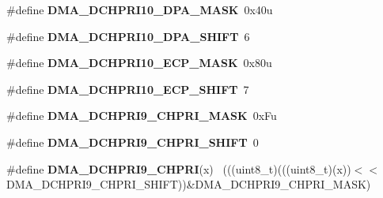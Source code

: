 \begin{DoxyCompactItemize}
\item 
\hypertarget{group___d_m_a___register___masks_gaf20edd13f4d37134819d152681b34b4e}{}\#define {\bfseries D\+M\+A\+\_\+\+D\+C\+H\+P\+R\+I10\+\_\+\+D\+P\+A\+\_\+\+M\+A\+S\+K}~0x40u\label{group___d_m_a___register___masks_gaf20edd13f4d37134819d152681b34b4e}

\item 
\hypertarget{group___d_m_a___register___masks_ga81809b2ae57f16cec20cb50f1a4a8b1e}{}\#define {\bfseries D\+M\+A\+\_\+\+D\+C\+H\+P\+R\+I10\+\_\+\+D\+P\+A\+\_\+\+S\+H\+I\+F\+T}~6\label{group___d_m_a___register___masks_ga81809b2ae57f16cec20cb50f1a4a8b1e}

\item 
\hypertarget{group___d_m_a___register___masks_ga7a9d675356e6d5951279c4781bb5a1c7}{}\#define {\bfseries D\+M\+A\+\_\+\+D\+C\+H\+P\+R\+I10\+\_\+\+E\+C\+P\+\_\+\+M\+A\+S\+K}~0x80u\label{group___d_m_a___register___masks_ga7a9d675356e6d5951279c4781bb5a1c7}

\item 
\hypertarget{group___d_m_a___register___masks_ga9d6bb10c4809a0eb5120c5e7cdf6adfc}{}\#define {\bfseries D\+M\+A\+\_\+\+D\+C\+H\+P\+R\+I10\+\_\+\+E\+C\+P\+\_\+\+S\+H\+I\+F\+T}~7\label{group___d_m_a___register___masks_ga9d6bb10c4809a0eb5120c5e7cdf6adfc}

\item 
\hypertarget{group___d_m_a___register___masks_gac782f5e68a3eef4653396b11311fc41b}{}\#define {\bfseries D\+M\+A\+\_\+\+D\+C\+H\+P\+R\+I9\+\_\+\+C\+H\+P\+R\+I\+\_\+\+M\+A\+S\+K}~0x\+Fu\label{group___d_m_a___register___masks_gac782f5e68a3eef4653396b11311fc41b}

\item 
\hypertarget{group___d_m_a___register___masks_ga673fcc8804637150719453e55168fc66}{}\#define {\bfseries D\+M\+A\+\_\+\+D\+C\+H\+P\+R\+I9\+\_\+\+C\+H\+P\+R\+I\+\_\+\+S\+H\+I\+F\+T}~0\label{group___d_m_a___register___masks_ga673fcc8804637150719453e55168fc66}

\item 
\hypertarget{group___d_m_a___register___masks_gaa9bd417a9c6625ab14410aa782030dc4}{}\#define {\bfseries D\+M\+A\+\_\+\+D\+C\+H\+P\+R\+I9\+\_\+\+C\+H\+P\+R\+I}(x)                                      ~(((uint8\+\_\+t)(((uint8\+\_\+t)(x))$<$$<$D\+M\+A\+\_\+\+D\+C\+H\+P\+R\+I9\+\_\+\+C\+H\+P\+R\+I\+\_\+\+S\+H\+I\+F\+T))\&D\+M\+A\+\_\+\+D\+C\+H\+P\+R\+I9\+\_\+\+C\+H\+P\+R\+I\+\_\+\+M\+A\+S\+K)\label{group___d_m_a___register___masks_gaa9bd417a9c6625ab14410aa782030dc4}


\end{DoxyCompactItemize}
